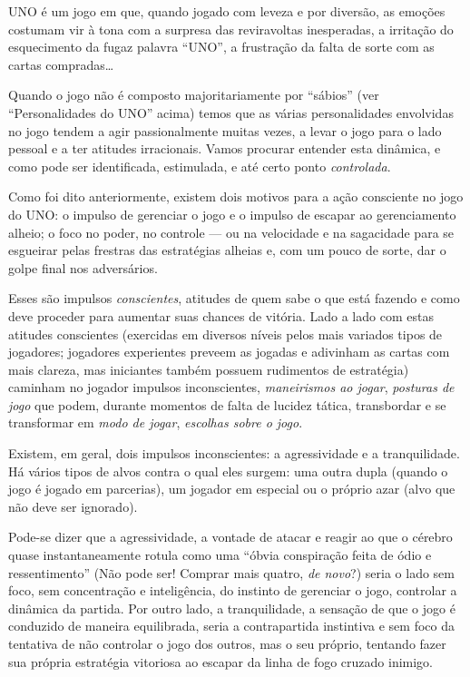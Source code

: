 UNO é um jogo em que, quando jogado com leveza e por diversão, as emoções costumam vir à tona com a surpresa das reviravoltas inesperadas, a irritação do esquecimento da fugaz palavra ``UNO'', a frustração da falta de sorte com as cartas compradas\ldots

Quando o jogo não é composto majoritariamente por ``sábios'' (ver ``Personalidades do UNO'' acima) temos que as várias personalidades envolvidas no jogo tendem a agir passionalmente muitas vezes, a levar o jogo para o lado pessoal e a ter atitudes irracionais. Vamos procurar entender esta dinâmica, e como pode ser identificada, estimulada, e até certo ponto \textit{controlada}.

Como foi dito anteriormente, existem dois motivos para a ação consciente no jogo do UNO: o impulso de gerenciar o jogo e o impulso de escapar ao gerenciamento alheio; o foco no poder, no controle --- ou na velocidade e na sagacidade para se esgueirar pelas frestras das estratégias alheias e, com um pouco de sorte, dar o golpe final nos adversários.

Esses são impulsos \textit{conscientes}, atitudes de quem sabe o que está fazendo e como deve proceder para aumentar suas chances de vitória. Lado a lado com estas atitudes conscientes (exercidas em diversos níveis pelos mais variados tipos de jogadores; jogadores experientes preveem as jogadas e adivinham as cartas com mais clareza, mas iniciantes também possuem rudimentos de estratégia) caminham no jogador impulsos inconscientes, \textit{maneirismos ao jogar}, \textit{posturas de jogo} que podem, durante momentos de falta de lucidez tática, transbordar e se transformar em \textit{modo de jogar}, \textit{escolhas sobre o jogo}.

Existem, em geral, dois impulsos inconscientes: a agressividade e a tranquilidade. Há vários tipos de alvos contra o qual eles surgem: uma outra dupla (quando o jogo é jogado em parcerias), um jogador em especial ou o próprio azar (alvo que não deve ser ignorado).

Pode-se dizer que a agressividade, a vontade de atacar e reagir ao que o cérebro quase instantaneamente rotula como uma ``óbvia conspiração feita de ódio e ressentimento'' (Não pode ser! Comprar mais quatro, \textit{de novo}?) seria o lado sem foco, sem concentração e inteligência, do instinto de gerenciar o jogo, controlar a dinâmica da partida. Por outro lado, a tranquilidade, a sensação de que o jogo é conduzido de maneira equilibrada, seria a contrapartida instintiva e sem foco da tentativa de não controlar o jogo dos outros, mas o seu próprio, tentando fazer sua própria estratégia vitoriosa ao escapar da linha de fogo cruzado inimigo.

